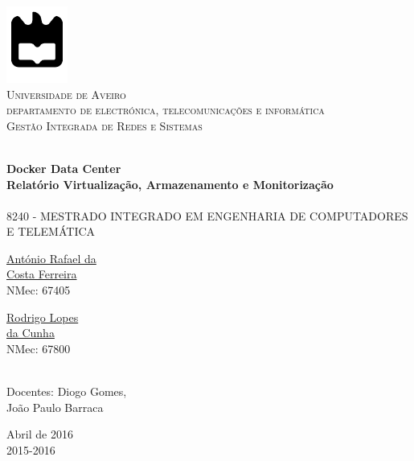 \begin{titlepage}

\begin{center}

\includegraphics[width=0.15\textwidth]{./logo}\\[0.5cm]    

\textsc{\large Universidade de Aveiro \\[1cm]\large departamento de electrónica, telecomunicações e informática}\\[1cm]

\textsc{\large Gestão Integrada de Redes e Sistemas\\[1cm]}

\HRule \\[0.5cm]
{ \huge \bfseries Docker Data Center}\\[0.4cm]
{ \large \bfseries Relatório Virtualização, Armazenamento e Monitorização}\\[0.4cm]
\HRule \\[1cm]

\textsc{\small{8240 - MESTRADO INTEGRADO EM ENGENHARIA DE COMPUTADORES E TELEMÁTICA}}\\[1cm]

\begin{minipage}{0.4\textwidth}

\begin{flushleft} \large
\href{mailto:rafael.ferreira@ua.pt}{António Rafael da \\ Costa Ferreira }
 \small{\\NMec: 67405}
\end{flushleft}
\end{minipage}
\begin{minipage}{0.4\textwidth}

\begin{flushright} \large
\href{mailto:rodrigocunha@ua.pt}{Rodrigo Lopes \\ da Cunha}
\small{\\NMec: 67800}
\end{flushright}
\end{minipage}\\[1cm]

{\large Docentes: Diogo Gomes,}\\
{\large \hspace{2.5cm} João Paulo Barraca}\\[0.5cm]


\vfill

{\large Abril de 2016 \\ 2015-2016}

\end{center}

\end{titlepage}